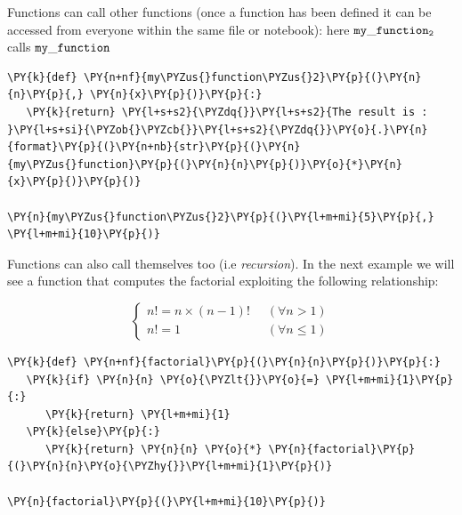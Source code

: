\begin{Shaded}
\begin{Highlighting}[]
\end{Highlighting}
\end{Shaded}

Functions can call other functions (once a function has been defined it can be accessed from everyone within the same file or notebook): here $\tt{my\_function_2}$ calls $\tt{my\_function}$

\begin{tcolorbox}[breakable, size=fbox, boxrule=1pt, pad at break*=1mm,colback=cellbackground, colframe=cellborder]
\begin{Verbatim}[commandchars=\\\{\}]
\PY{k}{def} \PY{n+nf}{my\PYZus{}function\PYZus{}2}\PY{p}{(}\PY{n}{n}\PY{p}{,} \PY{n}{x}\PY{p}{)}\PY{p}{:} 
   \PY{k}{return} \PY{l+s+s2}{\PYZdq{}}\PY{l+s+s2}{The result is : }\PY{l+s+si}{\PYZob{}\PYZcb{}}\PY{l+s+s2}{\PYZdq{}}\PY{o}{.}\PY{n}{format}\PY{p}{(}\PY{n+nb}{str}\PY{p}{(}\PY{n}{my\PYZus{}function}\PY{p}{(}\PY{n}{n}\PY{p}{)}\PY{o}{*}\PY{n}{x}\PY{p}{)}\PY{p}{)}

\PY{n}{my\PYZus{}function\PYZus{}2}\PY{p}{(}\PY{l+m+mi}{5}\PY{p}{,} \PY{l+m+mi}{10}\PY{p}{)}
\end{Verbatim}
\end{tcolorbox}

Functions can also call themselves too (i.e \emph{recursion}). In the next example we will see a function that computes the factorial exploiting the following relationship:

\[
\begin{cases}
    n! = n \times (n-1)! & \;\; (\forall n \gt 1) \\
    n! = 1 & \;\; (\forall n \le 1)
\end{cases}
\]

\begin{tcolorbox}[breakable, size=fbox, boxrule=1pt, pad at break*=1mm,colback=cellbackground, colframe=cellborder]
\begin{Verbatim}[commandchars=\\\{\}]
\PY{k}{def} \PY{n+nf}{factorial}\PY{p}{(}\PY{n}{n}\PY{p}{)}\PY{p}{:}
   \PY{k}{if} \PY{n}{n} \PY{o}{\PYZlt{}}\PY{o}{=} \PY{l+m+mi}{1}\PY{p}{:}
      \PY{k}{return} \PY{l+m+mi}{1}
   \PY{k}{else}\PY{p}{:}
      \PY{k}{return} \PY{n}{n} \PY{o}{*} \PY{n}{factorial}\PY{p}{(}\PY{n}{n}\PY{o}{\PYZhy{}}\PY{l+m+mi}{1}\PY{p}{)}

\PY{n}{factorial}\PY{p}{(}\PY{l+m+mi}{10}\PY{p}{)}
\end{Verbatim}
\end{tcolorbox}

